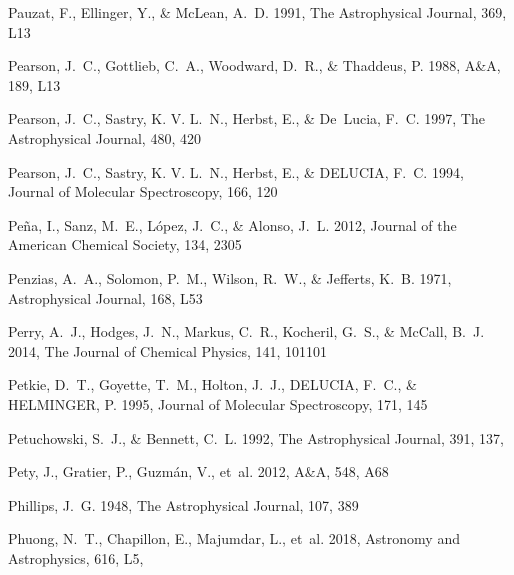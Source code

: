 \documentclass[twocolumn]{aastex631}
\begin{document}
\begin{thebibliography}{}
Pauzat, F., Ellinger, Y., \& McLean, A.~D. 1991, The Astrophysical Journal,
  369, L13

Pearson, J.~C., Gottlieb, C.~A., Woodward, D.~R., \& Thaddeus, P. 1988, A{\&}A,
  189, L13

Pearson, J.~C., Sastry, K. V. L.~N., Herbst, E., \& De~Lucia, F.~C. 1997, The
  Astrophysical Journal, 480, 420

Pearson, J.~C., Sastry, K. V. L.~N., Herbst, E., \& DELUCIA, F.~C. 1994,
  Journal of Molecular Spectroscopy, 166, 120

Pe{\~n}a, I., Sanz, M.~E., L{\'o}pez, J.~C., \& Alonso, J.~L. 2012, Journal of
  the American Chemical Society, 134, 2305

Penzias, A.~A., Solomon, P.~M., Wilson, R.~W., \& Jefferts, K.~B. 1971,
  Astrophysical Journal, 168, L53

Perry, A.~J., Hodges, J.~N., Markus, C.~R., Kocheril, G.~S., \& McCall, B.~J.
  2014, The Journal of Chemical Physics, 141, 101101

Petkie, D.~T., Goyette, T.~M., Holton, J.~J., DELUCIA, F.~C., \& HELMINGER, P.
  1995, Journal of Molecular Spectroscopy, 171, 145

{Petuchowski}, S.~J., \& {Bennett}, C.~L. 1992, The Astrophysical Journal, 391,
  137, 

Pety, J., Gratier, P., Guzm{\'a}n, V., {et~al.} 2012, A{\&}A, 548, A68

Phillips, J.~G. 1948, The Astrophysical Journal, 107, 389

{Phuong}, N.~T., {Chapillon}, E., {Majumdar}, L., {et~al.} 2018, Astronomy and
  Astrophysics, 616, L5, 


\end{thebibliography}
\end{document}
